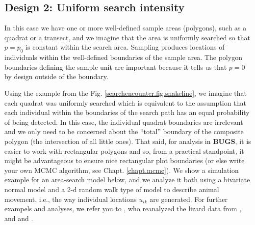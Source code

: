 \subsection{Design 2: Uniform search intensity}

In this case we
have one or more well-defined sample areas (polygons), such as a
quadrat or a transect, and we imagine that the area is uniformly
searched so that $p = p_0$ is constant within the search area.
Sampling produces locations of individuals within the well-defined
boundaries of the sample area. The polygon boundaries defining the
sample unit are important because it tells us that $p=0$ by design
outside of the boundary.

Using the example from the Fig. \ref{searchencounter.fig.snakeline},
we imagine that each quadrat was uniformly searched which is equivalent to the
assumption that each individual within the boundaries of the search
path has an equal probability of being detected. 
In this case, the
individual quadrat boundaries are irrelevant and we only need to be
concerned about the ``total'' boundary of the composite polygon (the
intersection of all little ones). That said, for analysis in {\bf
  BUGS}, it is easier to work with rectangular polygons and so, from a
practical standpoint, it might be advantageous to ensure nice
rectangular plot boundaries (or else write your own MCMC algorithm,
see Chapt. \ref{chapt.mcmc}).  We show a simulation example for an area-search model below, and
we analyze it both using a bivariate normal model and a
2-d random walk type of model to describe animal movement, i.e., the way individual locations $u_{ik}$ are generated. For further exampels and analyses, we refer you to \citet{royle_dorazio:2008}, who reanalyzed the lizard data from \citet{royle_young:2008}, and \citet{efford:2011ecol} and \citet{marques_etal:2011}.

